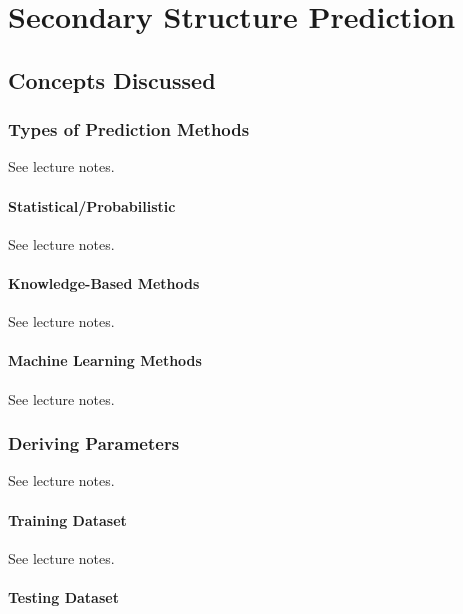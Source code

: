
\chapter{Secondary Structure Prediction} 

\label{Chapter8} 

\section{Concepts Discussed}

    \subsection{Types of Prediction Methods}

    See lecture notes.\autocite{T8}

        \subsubsection{Statistical/Probabilistic}

        See lecture notes.\autocite{T8}

        \subsubsection{Knowledge-Based Methods}

        See lecture notes.\autocite{T8}

        \subsubsection{Machine Learning Methods}

        See lecture notes.\autocite{T8}

    \subsection{Deriving Parameters}

    See lecture notes.\autocite{T8}

        \subsubsection{Training Dataset}

        See lecture notes.\autocite{T8}

        \subsubsection{Testing Dataset}

